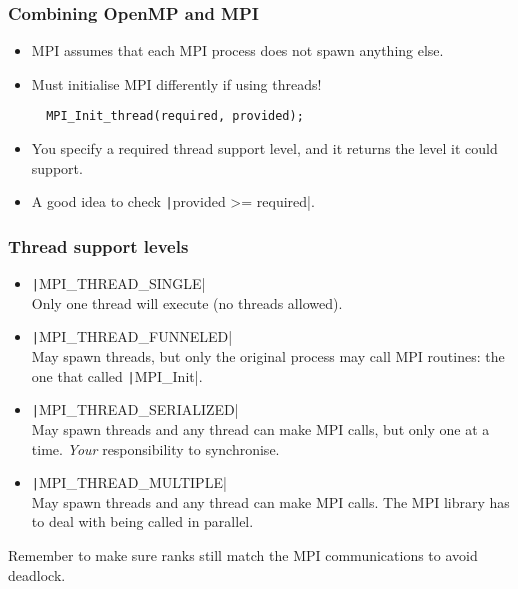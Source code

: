 \documentclass{beamer}
\begin{document}
\begin{frame}[fragile]
\frametitle{Combining OpenMP and MPI}
\begin{itemize}
  \item MPI assumes that each MPI process does not spawn anything else.
  \item Must initialise MPI differently if using threads!
  \begin{verbatim}
  MPI_Init_thread(required, provided);
  \end{verbatim}

  \item You specify a required thread support level, and it returns the level it could support.
  \item A good idea to check \texttt|provided >= required|.
\end{itemize}
\end{frame}

\begin{frame}
\frametitle{Thread support levels}
\begin{itemize}
  \item \texttt|MPI_THREAD_SINGLE| \\
  Only one thread will execute (no threads allowed).

  \item \texttt|MPI_THREAD_FUNNELED| \\
  May spawn threads, but only the original process may call MPI routines: the one that called \texttt|MPI_Init|.

  \item \texttt|MPI_THREAD_SERIALIZED| \\
  May spawn threads and any thread can make MPI calls, but only one at a time. \emph{Your} responsibility to synchronise.

  \item \texttt|MPI_THREAD_MULTIPLE| \\
  May spawn threads and any thread can make MPI calls. The MPI library has to deal with being called in parallel.
\end{itemize}

Remember to make sure ranks still match the MPI communications to avoid deadlock.

\end{frame}
\end{document}
